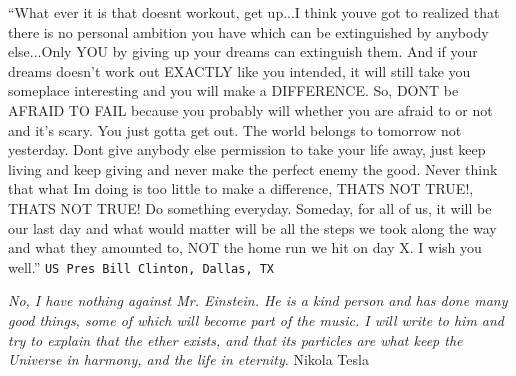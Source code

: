 \par 
\textsf{“What ever it is that doesn\textquotesingle t workout, get up...I think you\textquotesingle ve got to realized that there is no personal ambition you have which can be extinguished by anybody else...Only YOU by giving up your dreams can extinguish them. And if your dreams doesn’t work out EXACTLY like you intended, it will still take you someplace interesting and you will make a DIFFERENCE. So, DON\textquotesingle T be AFRAID TO FAIL because you probably will whether you are afraid to or not and it's scary. You just gotta get out. 
The world belongs to tomorrow not yesterday. Don\textquotesingle t give anybody else permission to take your life away, just keep living and keep giving and never make the perfect enemy the good. Never think that what I\textquotesingle m doing is too little to make a difference, THAT\textquotesingle S NOT TRUE!, THAT\textquotesingle S NOT TRUE!  Do something everyday. Someday, for all of us, it will be our last day and what would matter will be all the steps we took along the way and what they amounted to, NOT the home run we hit on day X. I wish you well.”}
\newline
\texttt{US Pres  Bill Clinton, Dallas, TX}
\par
\par 

\textit{No, I have nothing against Mr. Einstein. He is a kind person and has done many good things, some of which will become part of the music. I will write to him and try to explain that the ether exists, and that its particles are what keep the Universe in harmony, and the life in eternity}. 
\newline
Nikola Tesla

